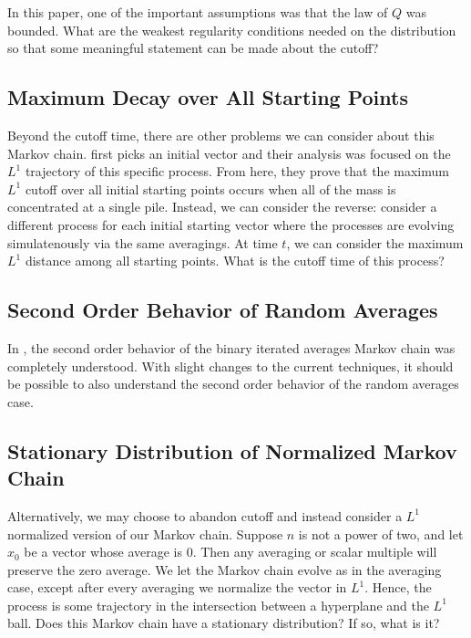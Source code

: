 \documentclass[12pt]{article}
\begin{document}
In this paper, one of the important assumptions was that the law of $Q$ was bounded. What are the weakest regularity conditions needed on the distribution so that some meaningful statement can be made about the cutoff?  

\subsection{Maximum Decay over All Starting Points}
Beyond the cutoff time, there are other problems we can consider about this Markov chain. \cite{chatterjee2021phase} first picks an initial vector and their analysis was focused on the $L^1$ trajectory of this specific process. From here, they prove that the maximum $L^1$ cutoff over all initial starting points occurs when all of the mass is concentrated at a single pile. Instead, we can consider the reverse: consider a different process for each initial starting vector where the processes are evolving simulatenously via the same averagings. At time $t$, we can consider the maximum $L^1$ distance among all starting points. What is the cutoff time of this process?

\subsection{Second Order Behavior of Random Averages}

In \cite{chatterjee2021phase}, the second order behavior of the binary iterated averages Markov chain was completely understood. With slight changes to the current techniques, it should be possible to also understand the second order behavior of the random averages case. 

\subsection{Stationary Distribution of Normalized Markov Chain}

Alternatively, we may choose to abandon cutoff and instead consider a $L^1$ normalized version of our Markov chain. Suppose $n$ is not a power of two, and let $x_0$ be a vector whose average is $0$. Then any averaging or scalar multiple will preserve the zero average. We let the Markov chain evolve as in the averaging case, except after every averaging we normalize the vector in $L^1$. Hence, the process is some trajectory in the intersection between a hyperplane and the $L^1$ ball. Does this Markov chain have a stationary distribution? If so, what is it?
\end{document}
